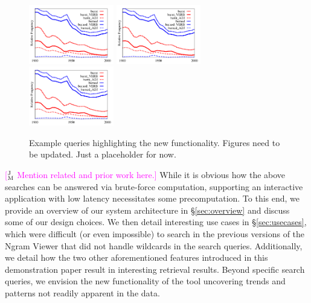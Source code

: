 \documentclass[11pt]{article}
\newcommand{\jmcomment}[1]{\textcolor{magenta}{[$^{\textsc{J}}_{\textsc{M}}$ #1]}}
\begin{document}
\begin{figure}
\centering
\hspace*{-0.5cm}
\includegraphics[width=0.33\textwidth]{graphs/university}
\hspace*{0.1cm}
\includegraphics[width=0.33\textwidth]{graphs/university}
\hspace*{0.1cm}
\includegraphics[width=0.33\textwidth]{graphs/university}
\hspace*{-0.5cm}
\vspace*{-0.25cm}\caption{\label{fig:examples}
Example queries highlighting the new functionality. Figures need to be updated. Just a placeholder for now.}
\end{figure}

\jmcomment{Mention related and prior work here.} While it is obvious how the above searches can be answered via brute-force computation, supporting an interactive application with low latency necessitates some precomputation. To this end, we provide an overview of our system architecture in \S\ref{sec:overview} and discuss some of our design choices. We then detail interesting use cases in \S\ref{sec:usecases}, which were difficult (or even impossible) to search in the previous versions of the Ngram Viewer that did not handle wildcards in the search queries. Additionally, we detail how the two other aforementioned features introduced in this demonstration paper result in interesting retrieval results. Beyond specific search queries, we envision the new functionality of the tool uncovering trends and patterns not readily apparent in the data.
\end{document}

